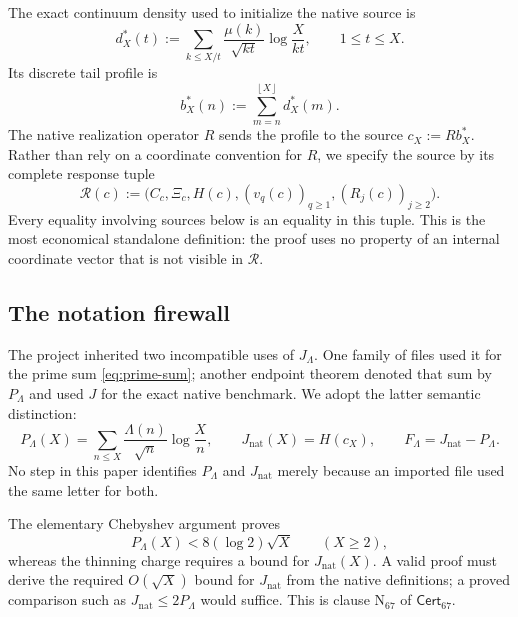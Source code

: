 \documentclass[11pt]{article}
\theoremstyle{definition}
\theoremstyle{remark}
\newcommand{\1}{\mathbf 1}
\newcommand{\Cert}{\mathsf{Cert}_{67}}
\newcommand{\Nat}{\mathrm{nat}}
\newcommand{\floor}[1]{\left\lfloor #1\right\rfloor}
\begin{document}
The exact continuum density used to initialize the native source is
\begin{equation}\label{eq:dstar}
d_X^*(t):=\sum_{k\le X/t}\frac{\mu(k)}{\sqrt{kt}}
          \log\frac{X}{kt},\qquad 1\le t\le X.
\end{equation}
Its discrete tail profile is
\begin{equation}\label{eq:bstar}
b_X^*(n):=\sum_{m=n}^{\floor X}d_X^*(m).
\end{equation}
The native realization operator \(R\) sends the profile to the source \(c_X:=Rb_X^*\).  Rather than rely on a coordinate convention for \(R\), we specify the source by its complete response tuple
\begin{equation}\label{eq:response-tuple}
\mathcal R(c):=\bigl(C_c,\Xi_c,H(c),(v_q(c))_{q\ge1},(R_j(c))_{j\ge2}\bigr).
\end{equation}
Every equality involving sources below is an equality in this tuple.  This is the most economical standalone definition: the proof uses no property of an internal coordinate vector that is not visible in \(\mathcal R\).

\subsection{The notation firewall}

The project inherited two incompatible uses of \(J_\Lambda\).  One family of files used it for the prime sum \eqref{eq:prime-sum}; another endpoint theorem denoted that sum by \(P_\Lambda\) and used \(J\) for the exact native benchmark.  We adopt the latter semantic distinction:
\begin{equation}\label{eq:notation-firewall}
\boxed{
P_\Lambda(X)=\sum_{n\le X}\frac{\Lambda(n)}{\sqrt n}\log\frac Xn,
\qquad
J_{\Nat}(X)=H(c_X),
\qquad
F_\Lambda=J_{\Nat}-P_\Lambda.}
\end{equation}
No step in this paper identifies \(P_\Lambda\) and \(J_{\Nat}\) merely because an imported file used the same letter for both.

\begin{auditbox}
The elementary Chebyshev argument proves
\[
P_\Lambda(X)<8(\log2)\sqrt X\qquad(X\ge2),
\]
whereas the thinning charge requires a bound for \(J_{\Nat}(X)\).  A valid proof must derive the required \(O(\sqrt X)\) bound for \(J_{\Nat}\) from the native definitions; a proved comparison such as \(J_{\Nat}\le 2P_\Lambda\) would suffice.  This is clause \(\mathrm{N}_{67}\) of \(\Cert\).
\end{auditbox}
\end{document}
